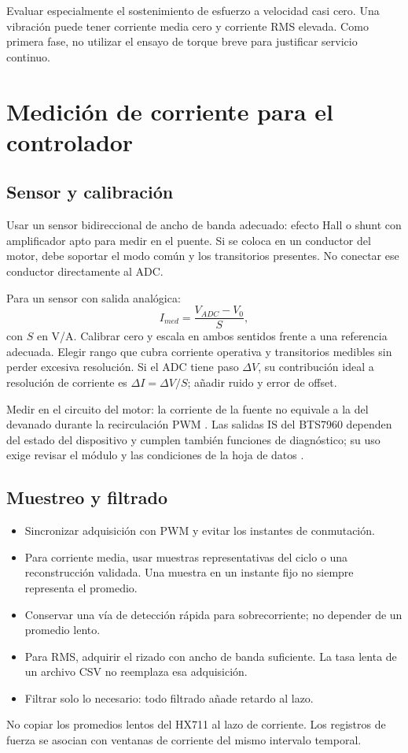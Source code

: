 \documentclass[11pt,a4paper]{article}
\begin{document}
Evaluar especialmente el sostenimiento de esfuerzo a velocidad casi cero. Una vibración puede tener corriente media cero y corriente RMS elevada. Como primera fase, no utilizar el ensayo de torque breve para justificar servicio continuo.

\section{Medición de corriente para el controlador}
\subsection{Sensor y calibración}
Usar un sensor bidireccional de ancho de banda adecuado: efecto Hall o shunt con amplificador apto para medir en el puente. Si se coloca en un conductor del motor, debe soportar el modo común y los transitorios presentes. No conectar ese conductor directamente al ADC.

Para un sensor con salida analógica:
\begin{equation}
I_{med}=\frac{V_{ADC}-V_0}{S},
\end{equation}
con $S$ en V/A. Calibrar cero y escala en ambos sentidos frente a una referencia adecuada. Elegir rango que cubra corriente operativa y transitorios medibles sin perder excesiva resolución. Si el ADC tiene paso $\Delta V$, su contribución ideal a resolución de corriente es $\Delta I=\Delta V/S$; añadir ruido y error de offset.

Medir en el circuito del motor: la corriente de la fuente no equivale a la del devanado durante la recirculación PWM \cite{maxon}. Las salidas IS del BTS7960 dependen del estado del dispositivo y cumplen también funciones de diagnóstico; su uso exige revisar el módulo y las condiciones de la hoja de datos \cite{bts}.

\subsection{Muestreo y filtrado}
\begin{itemize}
\item Sincronizar adquisición con PWM y evitar los instantes de conmutación.
\item Para corriente media, usar muestras representativas del ciclo o una reconstrucción validada. Una muestra en un instante fijo no siempre representa el promedio.
\item Conservar una vía de detección rápida para sobrecorriente; no depender de un promedio lento.
\item Para RMS, adquirir el rizado con ancho de banda suficiente. La tasa lenta de un archivo CSV no reemplaza esa adquisición.
\item Filtrar solo lo necesario: todo filtrado añade retardo al lazo.
\end{itemize}
No copiar los promedios lentos del HX711 al lazo de corriente. Los registros de fuerza se asocian con ventanas de corriente del mismo intervalo temporal.
\end{document}
